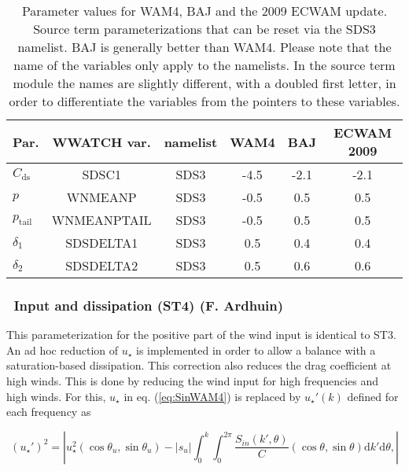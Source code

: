 \begin{table} \begin{center}
\begin{tabular}{|l|c|c|c|c|c|} \hline \hline
Par.                               &  WWATCH var.         & namelist & WAM4 & BAJ   & ECWAM 2009  \\
\hline
  $C_{\mathrm{ds}}$                 &  SDSC1          & SDS3 & -4.5 & -2.1& -2.1             \\
  $p$                               &  WNMEANP        & SDS3 & -0.5 & 0.5 &  0.5                \\
  $p_{\mathrm{tail}}$               &  WNMEANPTAIL    & SDS3 & -0.5 & 0.5 &  0.5                 \\
  $\delta_1$                        &  SDSDELTA1      & SDS3 & 0.5  & 0.4 &  0.4                  \\
  $\delta_2$                        &  SDSDELTA2      & SDS3 & 0.5  & 0.6 &  0.6 \\
  \hline \hline
\end{tabular} \end{center}
\caption{Parameter values for WAM4, BAJ and the 2009 ECWAM update. Source term
parameterizations that can be reset via the SDS3 namelist. BAJ is generally
better than WAM4. Please note that the
name of the variables only apply to the namelists. In the source term module
the names are slightly different, with a doubled first letter, in order to
differentiate the variables from the pointers to these variables.} \label{tab:WAM4_parSDS}
\end{table}

\vsssub
\subsubsection{~Input and dissipation (ST4) \hfill {\rm (F. Ardhuin)}} \label{sec:wam4}
\vsssub

This parameterization for the positive part of the wind input is identical to ST3. An ad hoc reduction of $u_\star$ is
implemented in order to allow a balance with a saturation-based dissipation.
This correction also reduces the drag coefficient at high winds. This is done by reducing 
the wind input for high frequencies and high winds. For this,  $u_\star$ in eq. (\ref{eq:SinWAM4}) is replaced 
by $u_\star '(k)$
defined for each frequency as

\begin{equation}
\left(u_\star '\right)^2=\left|u_\star^2 \left(\cos \theta_u, \sin
\theta_u \right) - \left|s_u\right| \int_0^k \int_0^{2 \pi}
\frac{S_{in}\left(k',\theta \right)}{C}  \left(\cos \theta, \sin
\theta \right)  {\mathrm d} k' \mathrm d
\theta,\label{ustarp}\right|
\end{equation}

